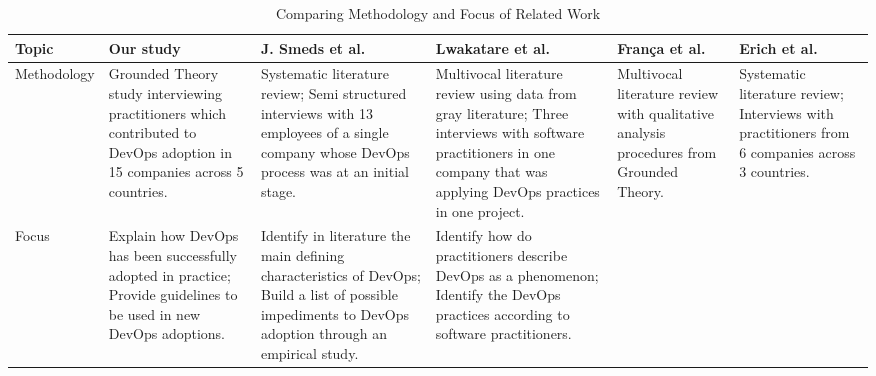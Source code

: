 \begin{table*}[t]
\centering
\caption{Comparing Methodology and Focus of Related Work}
\label{related_work_table}
\begin{tabular}{|p{1.7cm}|p{2.72cm}|p{2.72cm}|p{2.72cm}|p{2.72cm}|p{2.72cm}|}
\toprule
\textbf{Topic} &
\textbf{Our study} &
\textbf{J. Smeds et al.~\cite{devops_a_definition_xp_15}} &
\textbf{Lwakatare et al.~\cite{extending_dimensions_icsea_16}} &
\textbf{Fran\c{c}a et al.~\cite{characterizing_devops_sbes_2016}} &
\textbf{Erich et al.~\cite{qualitative_devops_journalsw_17}} \\ \midrule

Methodology

&
Grounded Theory study interviewing practitioners which contributed to DevOps
adoption in 15 companies across 5 countries.

&
Systematic literature review;
\newline \newline
Semi structured interviews with 13 employees of a single company whose DevOps
process was at an initial stage.

&
Multivocal literature review using data from gray literature;
\newline \newline
Three interviews with software practitioners in one company that was applying
DevOps practices in one project.

&
Multivocal literature review with qualitative analysis procedures from
Grounded Theory.

&
Systematic literature review;
\newline \newline
Interviews with practitioners from 6 companies across 3 countries.


\\ \midrule

Focus
&
Explain how DevOps has been successfully adopted in practice;
\newline \newline
Provide guidelines to be used in new DevOps adoptions.

&
Identify in literature the main defining characteristics of DevOps;
\newline \newline
Build a list of possible impediments to DevOps adoption through an empirical
study.

&
Identify how do practitioners describe DevOps as a phenomenon;
\newline \newline
Identify the DevOps practices according to software practitioners.


\end{tabular}
\end{table*}
